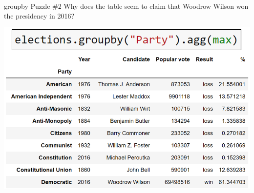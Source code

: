 \documentclass[aspectratio=169]{../latex_main/tntbeamer}  %
\begin{document}
    
    \begin{frame}{groupby Puzzle \#2}
    Why does the table seem to claim that Woodrow Wilson won the presidency in 2016?

        \centering
        \includegraphics[scale=.38]{Bild26}
    \end{frame}
    
    
    
\end{document}
